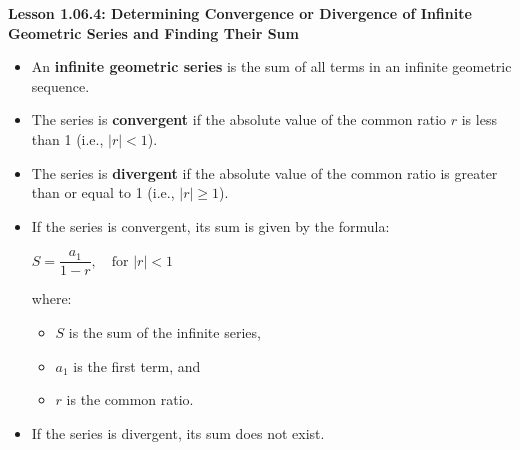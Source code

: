 \begin{center}
\textbf{Lesson 1.06.4: Determining Convergence or Divergence of Infinite Geometric Series and Finding Their Sum}
\end{center}

\vspace*{-1.5ex}

\begin{itemize}
    \item An \textbf{infinite geometric series} is the sum of all terms in an infinite geometric sequence.
    \item The series is \textbf{convergent} if the absolute value of the common ratio \( r \) is less than 1 (i.e., \( |r| < 1 \)).
    \item The series is \textbf{divergent} if the absolute value of the common ratio is greater than or equal to 1 (i.e., \( |r| \geq 1 \)).
    \item If the series is convergent, its sum is given by the formula:

{\centering $  S = \dfrac{a_1}{1 - r}, \quad \text{for } |r| < 1  $\par}
          where:
          \begin{itemize}
              \item \( S \) is the sum of the infinite series,
              \item \( a_1 \) is the first term, and
              \item \( r \) is the common ratio.
          \end{itemize}
    \item If the series is divergent, its sum does not exist.
\end{itemize}
